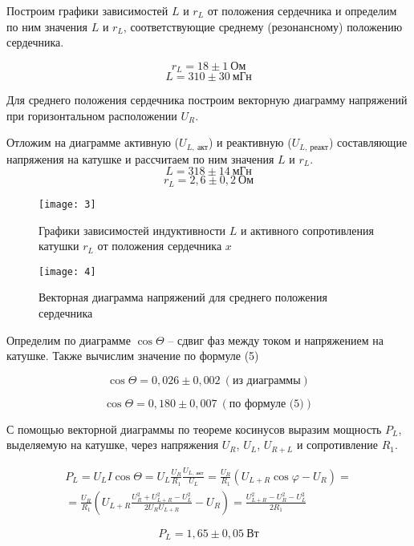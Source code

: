 Построим графики зависимостей $L$ и
$r_L$ от положения сердечника и
определим по ним значения $L$ и $r_L$,
соответствующие среднему (резонансному)
положению сердечника.

\[
    r_L = 18 \pm 1 \ \text{Ом}
\]
\[
    L = 310 \pm 30 \ \text{мГн}
\]

Для среднего положения
сердечника построим векторную диаграмму
напряжений
при горизонтальном расположении $U_R$.

Отложим на диаграмме активную ($U_{L, \
\text{акт}}$)
и реактивную ($U_{L, \
\text{реакт}}$) составляющие
напряжения на катушке и рассчитаем по
ним значения $L$ и $r_L$.
\[
    L = 318 \pm 14\ \text{мГн}
\]
\[
    r_L = 2,6 \pm 0,2\ \text{Ом}
\]

\begin{figure}[H]
    \centering
    \texttt{[image: 3]}
    \captionsetup{justification=centering}
    \caption{Графики
    зависимостей индуктивности $L$ и
активного сопротивления катушки $r_L$ от
положения сердечника $x$}
\end{figure}

\begin{figure}[H]
    \centering
    \texttt{[image: 4]}
    \captionsetup{justification=centering}
    \caption{Векторная диаграмма
    напряжений для среднего положения
сердечника}
\end{figure}

Определим по диаграмме $\cos\Theta$ --
сдвиг фаз между током и напряжением на
катушке. Также вычислим значение по
формуле (5)

\[
    \cos\Theta = 0,026 \pm
    0,002 \ (\text{из диаграммы})
\]

\[
    \cos\Theta = 0,180 \pm 0,007 \
    (\text{по формуле (5)})
\]


С помощью векторной диаграммы по теореме
косинусов выразим мощность $P_L$,
выделяемую на катушке, через напряжения
$U_R$, $U_L$, $U_{R+L}$ и сопротивление
$R_1$.

\begin{multline*}
   P_L = U_L I \cos\Theta = U_L
   \frac{U_R}{R_1}\frac{U_{L, \
   \text{акт}}}{U_L} =
   \frac{U_R}{R_1}(U_{L+R}\cos\varphi-U_R)
   = \\
   =
   \frac{U_R}{R_1}
   (U_{L+R}\frac{U_R^2+U_{L+R}^2-U_L^2}{2U_R
       U_{L+R}} - U_R) =
       \frac{U_{L+R}^2-U_R^2-U_L^2}{2 R_1}
\end{multline*}
   
\[
    P_L = 1,65 \pm 0,05 \ \text{Вт}
\]


